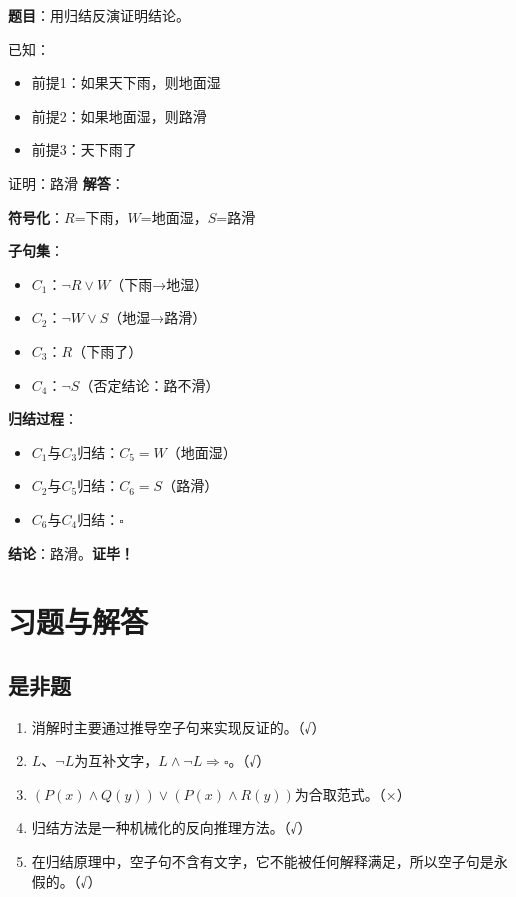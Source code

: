 \begin{examplebox}
\textbf{题目}：用归结反演证明结论。

已知：
\begin{itemize}[itemsep=0pt]
    \item 前提1：如果天下雨，则地面湿
    \item 前提2：如果地面湿，则路滑
    \item 前提3：天下雨了
\end{itemize}
证明：路滑
\tcblower
\textbf{解答}：

\textbf{符号化}：$R$=下雨，$W$=地面湿，$S$=路滑

\textbf{子句集}：
\begin{itemize}[itemsep=0pt]
    \item $C_1$：$\neg R \lor W$（下雨→地湿）
    \item $C_2$：$\neg W \lor S$（地湿→路滑）
    \item $C_3$：$R$（下雨了）
    \item $C_4$：$\neg S$（否定结论：路不滑）
\end{itemize}

\textbf{归结过程}：
\begin{itemize}[itemsep=0pt]
    \item $C_1$与$C_3$归结：$C_5 = W$（地面湿）
    \item $C_2$与$C_5$归结：$C_6 = S$（路滑）
    \item $C_6$与$C_4$归结：$\square$
\end{itemize}

\textbf{结论}：路滑。\textbf{证毕！}
\end{examplebox}

\section{习题与解答}

\subsection{是非题}

\begin{enumerate}[leftmargin=2em,itemsep=2pt]
    \item 消解时主要通过推导空子句来实现反证的。（√）
    \item $L$、$\neg L$为互补文字，$L \land \neg L \Rightarrow \square$。（√）
    \item $(P(x) \land Q(y)) \lor (P(x) \land R(y))$为合取范式。（×）
    \item 归结方法是一种机械化的反向推理方法。（√）
    \item 在归结原理中，空子句不含有文字，它不能被任何解释满足，所以空子句是永假的。（√）
\end{enumerate}

